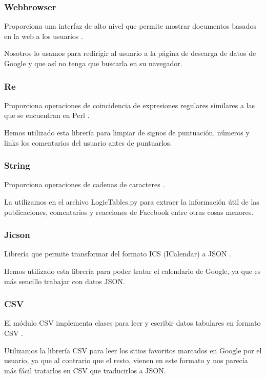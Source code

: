  		 \subsubsection*{Webbrowser} 
 		 	Proporciona una interfaz de alto nivel que permite mostrar documentos basados en la web a los usuarios \citep{webbrowser}.
 		 
 		  	Nosotros lo usamos para redirigir al usuario a la página de descarga de datos de Google y que así no tenga que buscarla en su navegador.
 		 
 		 \subsubsection*{Re} 
 		 	Proporciona operaciones de coincidencia de expresiones regulares similares a las que se encuentran en Perl \citep{re}.
 		 
 		 	Hemos utilizado esta librería para limpiar de signos de puntuación, números y links los comentarios del usuario antes de puntuarlos.
 		 
 		 \subsubsection*{String} 
 		 	Proporciona operaciones de cadenas de caracteres \citep{String}.
 		 
 		 	La utilizamos en el archivo LogicTables.py para extraer la información útil de las publicaciones, comentarios y reacciones de Facebook entre otras cosas menores.
 		 
 		 \subsubsection*{Jicson} 
 		 	Librería que permite transformar del formato ICS (ICalendar) a JSON \citep{Jicson}.
 		 
 		 	Hemos utilizado esta librería para poder tratar el calendario de Google, ya que es más sencillo trabajar con datos JSON.
 		 
 		 \subsubsection*{CSV} 
 		 	El módulo CSV implementa clases para leer y escribir datos tabulares en formato CSV \citep{CSV}.
 		 
 		 	Utilizamos la librería CSV para leer los sitios favoritos marcados en Google por el usuario, ya que al contrario que el resto, vienen en este formato y nos parecía más fácil tratarlos en CSV que traducirlos a JSON.
 		 	
